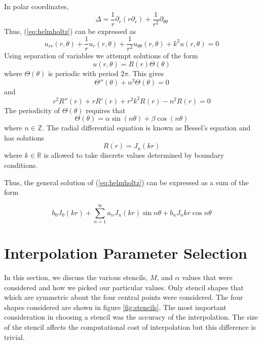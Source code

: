 \documentclass{report}
\begin{document}
In polar coordinates,
\[
\Delta = \frac{1}{r} \partial_{r} (r \partial_{r}) + \frac{1}{r^{2}} \partial_{\theta \theta}
\]
Thus, (\ref{eq:helmholtz}) can be expressed as
\[
u_{rr}(r, \theta) + \frac{1}{r} u_{r}(r, \theta) + \frac{1}{r^{2}} u_{\theta \theta}(r, \theta) + k^2 u(r, \theta) = 0
\]
Using separation of variables we attempt solutions of the form
\[
u(r, \theta) = R(r) \Theta(\theta)
\]
where $\Theta(\theta)$ is periodic with period $2 \pi$. This gives
\[
\Theta''(\theta) + n^{2} \Theta(\theta) = 0
\]
and
\[
r^{2} R''(r) + r R'(r) + r^{2} k^{2} R(r) - n^{2} R(r) = 0
\]
The periodicity of $\Theta(\theta)$ requires that
\[
\Theta(\theta) = \alpha \sin(n \theta) + \beta \cos(n \theta)
\]
where $n \in \mathbb{Z}$.
The radial differential equation is known as Bessel's equation and has solutions
\[
R(r) = J_{n}(k r)
\]
where $k \in \mathbb{R}$ is allowed to take discrete values determined by boundary conditions.

Thus, the general solution of (\ref{eq:helmholtz}) can be expressed as a sum of the form

\begin{equation}
  \label{eq:helmholtz_gen_soln}
  b_{0} J_{0}(kr) + \sum_{n = 1}^{\infty}{a_{n} J_n(kr) \sin{n \theta} + b_{n} J_n{kr} \cos{n \theta}}
\end{equation}

\chapter{Interpolation Parameter Selection}
\label{sec:params}
In this section, we discuss the various stencils, $M$, and $\alpha$ values that were considered and how we picked our particular values.
Only stencil shapes that which are symmetric about the four central points were considered. The four shapes considered are shown in figure \ref{fig:stencils}. The most important consideration in choosing a stencil was the accuracy of the interpolation. The size of the stencil affects the computational cost of interpolation but this difference is trivial.
\end{document}
